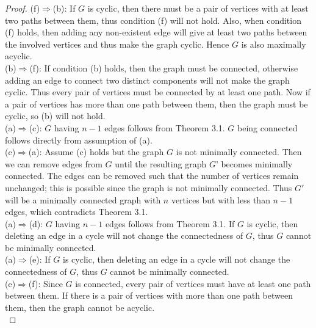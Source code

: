 \documentclass{article}
\begin{document}
\begin{enumerate}[label={\bf Q\arabic*:}]
\begin{proof}
      (f)$\Rightarrow$(b): If $G$ is cyclic, then there must be a pair of
      vertices with at least two paths between them, thus condition (f)
      will not hold. Also, when condition (f) holds, then adding any
      non-existent edge will give at least two paths between the involved
      vertices and thus make the graph cyclic. Hence $G$ is also maximally
      acyclic. \\

      (b)$\Rightarrow$(f): If condition (b) holds, then the graph must be
      connected, otherwise adding an edge to connect two distinct
      components will not make the graph cyclic. Thus every pair of
      vertices must be connected by at least one path. Now if a pair of
      vertices has more than one path between them, then the graph must be
      cyclic, so (b) will not hold. \\

      (a)$\Rightarrow$(c): $G$ having $n-1$ edges follows from Theorem 3.1.
      $G$ being connected follows directly from assumption of (a). \\

      (c)$\Rightarrow$(a): Assume (c) holds but the graph $G$ is not
      minimally connected. Then we can remove edges from $G$ until the
      resulting graph $G$' becomes minimally connected. The edges can be
      removed such that the number of vertices remain unchanged; this is
      possible since the graph is not minimally connected. Thus $G'$ will
      be a minimally connected graph with $n$ vertices but with less than
      $n-1$ edges, which contradicts Theorem 3.1. \\

      (a)$\Rightarrow$(d): $G$ having $n-1$ edges follows from Theorem 3.1.
      If $G$ is cyclic, then deleting an edge in a cycle will not change
      the connectedness of $G$, thus $G$ cannot be minimally connected. \\

      (a)$\Rightarrow$(e): If $G$ is cyclic, then deleting an edge in a
      cycle will not change the connectedness of $G$, thus $G$ cannot be
      minimally connected. \\

      (e)$\Rightarrow$(f): Since $G$ is connected, every pair of vertices
      must have at least one path between them. If there is a pair of
      vertices with more than one path between them, then the graph cannot
      be acyclic. \\


\end{proof}
\end{enumerate}
\end{document}
